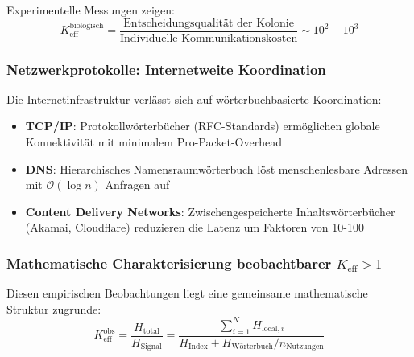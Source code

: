 \documentclass[11pt,a4paper]{article}
\begin{document}
	Experimentelle Messungen zeigen:
	\begin{equation}
		K_{\mathrm{eff}}^{\text{biologisch}} = \frac{\text{Entscheidungsqualität der Kolonie}}{\text{Individuelle Kommunikationskosten}} \sim 10^2 - 10^3
	\end{equation}
	
	\subsubsection{Netzwerkprotokolle: Internetweite Koordination}
	Die Internetinfrastruktur verlässt sich auf wörterbuchbasierte Koordination:
	\begin{itemize}
		\item \textbf{TCP/IP}: Protokollwörterbücher (RFC-Standards) ermöglichen globale Konnektivität mit minimalem Pro-Packet-Overhead
		\item \textbf{DNS}: Hierarchisches Namensraumwörterbuch löst menschenlesbare Adressen mit $\mathcal{O}(\log n)$ Anfragen auf
		\item \textbf{Content Delivery Networks}: Zwischengespeicherte Inhaltswörterbücher (Akamai, Cloudflare) reduzieren die Latenz um Faktoren von 10-100
	\end{itemize}
	
	\subsubsection{Mathematische Charakterisierung beobachtbarer $K_{\mathrm{eff}} > 1$}
	Diesen empirischen Beobachtungen liegt eine gemeinsame mathematische Struktur zugrunde:
	\begin{equation}
		K_{\mathrm{eff}}^{\text{obs}} = \frac{H_{\text{total}}}{H_{\text{Signal}}} = \frac{\sum_{i=1}^N H_{\text{local}, i}}{H_{\text{Index}} + H_{\text{Wörterbuch}}/n_{\text{Nutzungen}}}
	\end{equation}
	
\end{document}
